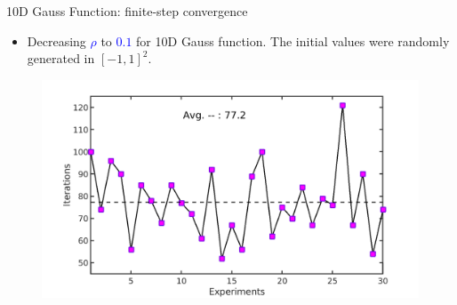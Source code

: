 \documentclass{beamer}
\begin{document}
\begin{frame}{10D Gauss Function: finite-step convergence}
\footnotesize{
	\begin{itemize}
		\item{Decreasing \textcolor{blue}{$\rho$} to
			\textcolor{blue}{$0.1$} for 10D Gauss function. The
			initial values were randomly generated in
			$[-1,1]^2$.}
	\end{itemize}
	}
	\vspace{-0.6cm}
\begin{figure}[!htbp]
	\centering
	  \includegraphics[scale=0.22]{./figures/gauss10Drandr0_1.png}
\end{figure}
\end{frame}
\end{document}
